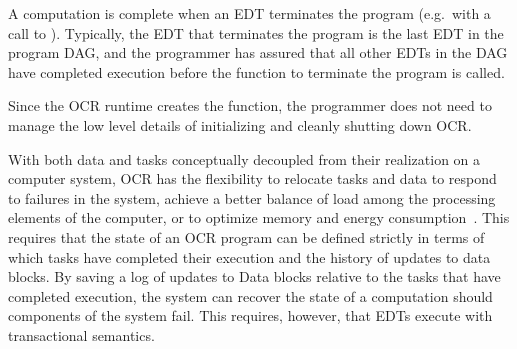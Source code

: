 
A computation is complete when an EDT terminates the program
(e.g.\ with a call to ). Typically, the EDT that
terminates the program is the last EDT in the program DAG, and the
programmer has assured that all other EDTs in the DAG have completed
execution before the function to terminate the program is called.

Since the OCR runtime creates the 
function, the programmer does not need to manage the low level
details of initializing and cleanly shutting down OCR.

With both data and tasks conceptually decoupled from their realization
on a computer system, OCR has the flexibility to relocate tasks and data
to respond to failures in the system, achieve a better balance of load
among the processing elements of the computer, or to optimize memory
and energy consumption~\cite{GZCS10,Guo10,CTBCCGYS13,SbBS14}.
This requires that the state of an OCR program can be defined
strictly in terms of which tasks have completed their execution
and the history of updates to data blocks. By saving a log of updates to Data blocks
relative to the tasks that have completed execution, the system can recover
the state of a computation should components of the system fail. This requires,
however, that EDTs execute with transactional semantics.

